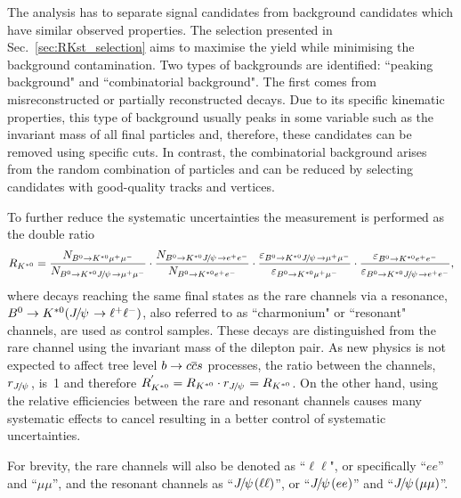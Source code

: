 The analysis has to separate signal candidates from background candidates which have similar observed properties. 
The selection presented in Sec.~\ref{sec:RKst_selection} aims to maximise the yield while minimising
the background contamination. Two types of backgrounds are identified: ``peaking background" and ``combinatorial background". 
The first comes from misreconstructed or partially reconstructed decays. Due to its specific kinematic properties, this type 
of background usually peaks in some variable such as the invariant
mass of all final particles and, therefore, these candidates can be removed using specific cuts. 
In contrast, the combinatorial background arises from the random combination of particles and can 
be reduced by selecting candidates with good-quality tracks and vertices.

To further reduce the systematic uncertainties the measurement is performed as the double ratio 
%
\begin{equation}
\label{eq:RKst}
R_{\Kstarz} = 
\frac{N_{\Bz\to\Kstarz \mumu}}{N_{\Bz\to\Kstarz\jpsi\to \mumu}} 
\cdot \frac{N_{\Bz\to\Kstarz \jpsi \to \ee}}{N_{\Bz\to\Kstarz\ee}}
\cdot \frac{\varepsilon_{\Bz\to\Kstarz \jpsi \to \mumu}}{\varepsilon_{\Bz\to\Kstarz \mumu}} 
\cdot \frac{\varepsilon_{\Bz\to\Kstarz \ee}}{\varepsilon_{\Bz\to\Kstarz\jpsi\to \ee}},
\end{equation}
%
where decays reaching the same final states as the rare channels via a \jpsi resonance, $\Bz\to\Kstarz(\jpsi\to\ll)$,
also referred to as ``charmonium" or ``resonant" channels, are used as control samples.
These decays are distinguished from the rare channel using the invariant mass of the dilepton pair.
%
%
As new physics is not expected to affect tree level $b\rightarrow{\ensuremath{c}}{\ensuremath{\overline {{c}}}}{\ensuremath{s}}$ processes, the ratio 
between the \jpsi channels, $r_{\jpsi}$, \mbox{is 1} and therefore \mbox{$\RKst^{'} = \RKst \cdot r_{\jpsi} = \RKst$}.
On the other hand, using the relative efficiencies between the rare and resonant channels
causes many systematic effects to cancel resulting in a better control of systematic uncertainties.  

For brevity, the rare channels will also be denoted as ``$\ell\ell$", or
specifically ``$ee$'' and ``$\mu\mu$'', and the resonant channels as ``$\jpsi(\ell\ell)$'',
or ``$\jpsi(ee)$'' and ``$\jpsi(\mu\mu)$''.

